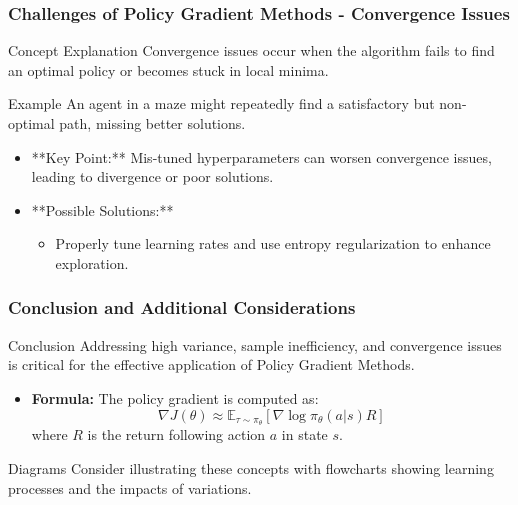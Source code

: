 \documentclass{beamer}
\begin{document}
\begin{frame}[fragile]
    \frametitle{Challenges of Policy Gradient Methods - Convergence Issues}
    \begin{block}{Concept Explanation}
        Convergence issues occur when the algorithm fails to find an optimal policy or becomes stuck in local minima.
    \end{block}
    
    \begin{block}{Example}
        An agent in a maze might repeatedly find a satisfactory but non-optimal path, missing better solutions.
    \end{block}
    
    \begin{itemize}
        \item **Key Point:** Mis-tuned hyperparameters can worsen convergence issues, leading to divergence or poor solutions.
        \item **Possible Solutions:**
        \begin{itemize}
            \item Properly tune learning rates and use entropy regularization to enhance exploration.
        \end{itemize}
    \end{itemize}
\end{frame}

\begin{frame}[fragile]
    \frametitle{Conclusion and Additional Considerations}
    \begin{block}{Conclusion}
        Addressing high variance, sample inefficiency, and convergence issues is critical for the effective application of Policy Gradient Methods.
    \end{block}
    
    \begin{itemize}
        \item \textbf{Formula:} The policy gradient is computed as:
        \begin{equation}
            \nabla J(\theta) \approx \mathbb{E}_{\tau \sim \pi_{\theta}}\left[\nabla \log \pi_{\theta}(a|s) R\right]
        \end{equation}
        where \(R\) is the return following action \(a\) in state \(s\).
    \end{itemize}
    \begin{block}{Diagrams}
        Consider illustrating these concepts with flowcharts showing learning processes and the impacts of variations.
    \end{block}
\end{frame}
\end{document}
